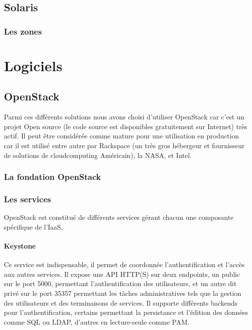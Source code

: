 \documentclass[a4paper,oneside]{report}
\begin{document}
\section{Solaris}

\subsection{Les zones}


\chapter{Logiciels}
\section{OpenStack}
Parmi ces différents solutions nous avons choisi d'utiliser OpenStack car c’est un projet Open source (le code source est disponibles gratuitement sur Internet) très actif.
Il peut être considérée comme mature pour une utilisation en production car il est utilisé entre autre par Rackspace (un très gros hébergeur et fournisseur de solutions de \gls{cloudcomputing} Américain), la NASA, et Intel.

\subsection{La fondation OpenStack}


\subsection{Les services}
OpenStack est constitué de différents services gérant chacun une composante spécifique de l'IaaS.
\subsubsection{Keystone}
Ce service est indispensable, il permet de coordonnée l'authentification et l'accès aux autres services.\newline
Il expose une API HTTP(S) sur deux endpoints, un public sur le port 5000, permettant l'authentification des utilisateurs, et un autre dit privé sur le port 35357 permettant les tâches administratives tels que la gestion des utilisateurs et des terminaisons de services.
Il supporte différents backends pour l'authentification, certains permettant la persistance et l'édition des données comme SQL ou LDAP, d'autres en lecture-seule comme PAM.\newline
\end{document}

